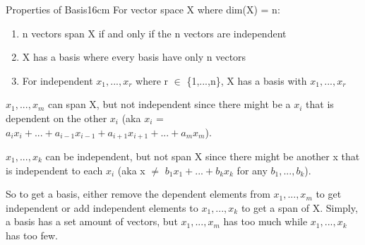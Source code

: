     \vspace{0.5cm}



    \begin{wtheorem}{Properties of Basis}{16cm}
        For vector space X where dim(X) = n:

        \begin{enumerate}[label=(\alph*), itemsep=0.1cm]
            \item n vectors span X if and only if the n vectors are independent

            \item X has a basis where every basis have only n vectors
            
            \item For independent $x_1,...,x_r$ where r $\in$ \{1,...,n\},
                X has a basis with $x_1,...,x_r$
        \end{enumerate}        
    \end{wtheorem}

    \begin{intuition}
        $x_1,...,x_m$ can span X, but not independent since there might
        be a $x_i$ that is dependent on the other $x_i$
        (aka $x_i$ = $a_ix_i + ... + a_{i-1}x_{i-1}
                    + a_{i+1}x_{i+1} + ... + a_mx_m$).
        
        $x_1,...,x_k$ can be independent, but not span X since there might
        be another x that is independent to each $x_i$
        (aka x $\not =$ $b_1x_1 + ... + b_kx_k$ for any $b_1,...,b_k$).
        
        So to get a basis, either remove the dependent elements from
        $x_1,...,x_m$ to get independent or add independent elements
        to $x_1,...,x_k$ to get a span of X.
        Simply, a basis has a set amount of vectors, but
        $x_1,...,x_m$ has too much while $x_1,...,x_k$ has too few.
    \end{intuition}

